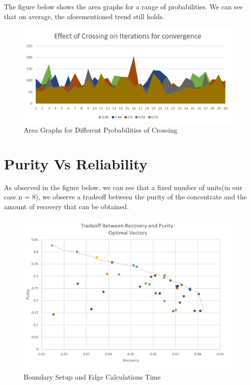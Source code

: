 \documentclass[twoside,twocolumn]{article}
\begin{document}
The figure below shows the area graphs for a range of probabilities. We can see that on average, the aforementioned trend still holds.
\vspace{-4mm}
\begin{figure}[h]
\centering
\includegraphics[height=4.5 cm\textwidth]{images/crossingarea.png}
\caption{Area Graphs for Different Probabilities of Crossing}
\end{figure}


\section{Purity Vs Reliability}
As observed in the figure below, we can see that a fixed number of units(in our case n = 8), we observe a tradeoff between the purity of the concentrate and the amount of recovery that can be obtained.
\vspace{-4mm}
\begin{figure}[H]
\centering
\includegraphics[height=6 cm\textwidth]{images/Picture1.png}
\caption{Boundary Setup and Edge Calculations Time}
\end{figure}
\vspace{-4mm}
\end{document}
